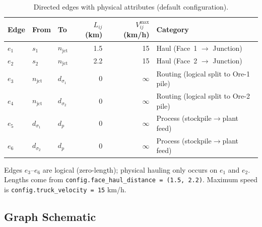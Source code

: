 \documentclass[11pt,a4paper]{article}
\theoremstyle{definition}
\begin{document}
\begin{table}[H]
\centering
\caption{Directed edges with physical attributes (default configuration).}
\label{tab:edges}
\begin{tabular}{@{}lllrrl@{}}
\toprule
\textbf{Edge} & \textbf{From} & \textbf{To} & $L_{ij}$ \textbf{(km)} & $V_{ij}^{\max}$ \textbf{(km/h)} & \textbf{Category} \\
\midrule
$e_1$ & $s_1$ & $n_{\text{jct}}$     & 1.5 & 15 & Haul (Face~1 $\to$ Junction) \\
$e_2$ & $s_2$ & $n_{\text{jct}}$     & 2.2 & 15 & Haul (Face~2 $\to$ Junction) \\
$e_3$ & $n_{\text{jct}}$ & $d_{\sigma_1}$ & 0   & $\infty$ & Routing (logical split to Ore-1 pile) \\
$e_4$ & $n_{\text{jct}}$ & $d_{\sigma_2}$ & 0   & $\infty$ & Routing (logical split to Ore-2 pile) \\
$e_5$ & $d_{\sigma_1}$ & $d_p$         & 0   & $\infty$ & Process (stockpile$\to$plant feed) \\
$e_6$ & $d_{\sigma_2}$ & $d_p$         & 0   & $\infty$ & Process (stockpile$\to$plant feed) \\
\bottomrule
\end{tabular}
\end{table}

\noindent
Edges $e_3$--$e_6$ are logical (zero-length); physical hauling only occurs on
$e_1$ and $e_2$.  Lengths come from \texttt{config.face\_haul\_distance = (1.5, 2.2)}.
Maximum speed is \texttt{config.truck\_velocity = 15} km/h.

\subsection{Graph Schematic}
\end{document}
